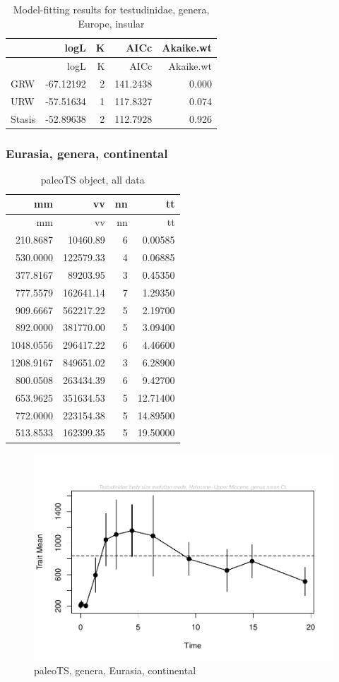 \begin{longtable}[]{@{}lrrrr@{}}
	\caption{Model-fitting results for testudinidae, genera, Europe,
		insular}
	\label{tab:pTSEuIEM}\tabularnewline
	\toprule
	& logL & K & AICc & Akaike.wt\tabularnewline
	\midrule
	\endfirsthead
	\toprule
	& logL & K & AICc & Akaike.wt\tabularnewline
	\midrule
	\endhead
	GRW & -67.12192 & 2 & 141.2438 & 0.000\tabularnewline
	URW & -57.51634 & 1 & 117.8327 & 0.074\tabularnewline
	Stasis & -52.89638 & 2 & 112.7928 & 0.926\tabularnewline
	\bottomrule
\end{longtable}

\FloatBarrier




\subsubsection*{Eurasia, genera,
	continental}\label{eurasiagenera-continental}

\begin{longtable}[]{@{}rrrr@{}}
	\caption{paleoTS object, all data}\tabularnewline
	\toprule
	mm & vv & nn & tt\tabularnewline
	\midrule
	\endfirsthead
	\toprule
	mm & vv & nn & tt\tabularnewline
	\midrule
	\endhead
	210.8687 & 10460.89 & 6 & 0.00585\tabularnewline
	530.0000 & 122579.33 & 4 & 0.06885\tabularnewline
	377.8167 & 89203.95 & 3 & 0.45350\tabularnewline
	777.5579 & 162641.14 & 7 & 1.29350\tabularnewline
	909.6667 & 562217.22 & 5 & 2.19700\tabularnewline
	892.0000 & 381770.00 & 5 & 3.09400\tabularnewline
	1048.0556 & 296417.22 & 6 & 4.46600\tabularnewline
	1208.9167 & 849651.02 & 3 & 6.28900\tabularnewline
	800.0508 & 263434.39 & 6 & 9.42700\tabularnewline
	653.9625 & 351634.53 & 5 & 12.71400\tabularnewline
	772.0000 & 223154.38 & 5 & 14.89500\tabularnewline
	513.8533 & 162399.35 & 5 & 19.50000\tabularnewline
	\bottomrule
\end{longtable}

\begin{figure}[H]
	\centering
	\includegraphics{MA_JJ_files/figure-latex/pTSEsC-1.pdf}
	\caption{paleoTS, genera, Eurasia, continental}
	\label{fig:pTSEsC}
\end{figure}


